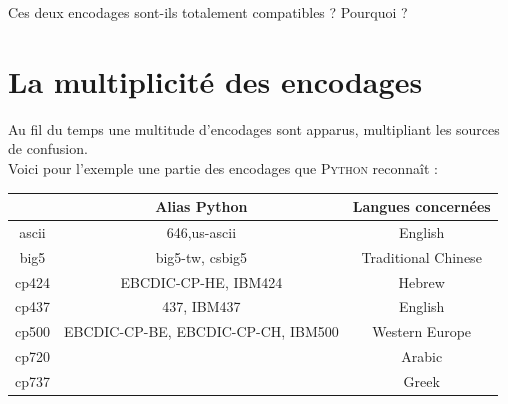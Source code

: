 \begin{exercice}[]
    Ces deux encodages sont-ils totalement compatibles ? Pourquoi ?
\end{exercice}

\section{La multiplicité des encodages}

Au fil du temps une multitude d'encodages sont apparus, multipliant les sources de confusion.\\
Voici pour l'exemple une partie des encodages que \textsc{Python} reconnaît :
\alternaterowcolors
\begin{center}
    {\tiny
        \begin{tabular}{|c|c|c|}
            \hline
            \rowcolor{UGLiOrange}{\boxfont\color{white}Encodage} & {\boxfont\color{white}Alias Python}                                                    & {\boxfont\color{white}Langues concernées}                           \\
            \hline
            ascii             & 646,us-ascii                                                             & English                                               \\\hline
            big5              & big5-tw, csbig5                                                          & Traditional Chinese                                   \\\hline
            cp424             & EBCDIC-CP-HE, IBM424                                                     & Hebrew                                                \\\hline
            cp437             & 437, IBM437                                                              & English                                               \\\hline
            cp500             & EBCDIC-CP-BE, EBCDIC-CP-CH, IBM500                                       & Western Europe                                        \\\hline
            cp720             &                                                                          & Arabic                                                \\\hline
            cp737             &                                                                          & Greek                                                 \\\hline

\end{tabular}}
\end{center}
